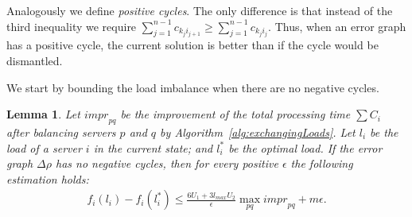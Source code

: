 \documentclass[11pt]{article}
\newcommand{\lmax}{{{l_{\mathit{max}}}}}
\newtheorem{lemma}[theorem]{Lemma}
\begin{document}
Analogously we define \emph{positive cycles}. The only difference is that instead of the third inequality we require $\sum_{j=1}^{n-1} c_{k_{j}i_{j+1}} \geq \sum_{j=1}^{n-1} c_{k_{j}i_{j}}$. Thus, when an error graph has a positive cycle, the current solution is better than if the cycle would be dismantled.


We start by bounding the load imbalance when there are no negative cycles.

\begin{lemma}\label{lemma::convergence}
Let $\mathit{impr}_{pq}$ be the improvement of the total processing time $\sum C_{i}$ after balancing servers $p$ and $q$ by Algorithm~\ref{alg:exchangingLoads}. 
Let $l_i$ be the load of a server $i$ in the current state; and $l^{*}_i$ be the optimal load. 
If the error graph $\Delta \rho$ has no negative cycles, then for every positive $\epsilon$ the following estimation holds:
\begin{align*}
f_i(l_i) -  f_i(l^{*}_{i}) \leq \frac{6U_1 + 3\lmax U_2}{\epsilon} \max_{pq} \mathit{impr}_{pq} + m\epsilon \text{.}
\end{align*}
\end{lemma}
\end{document}
